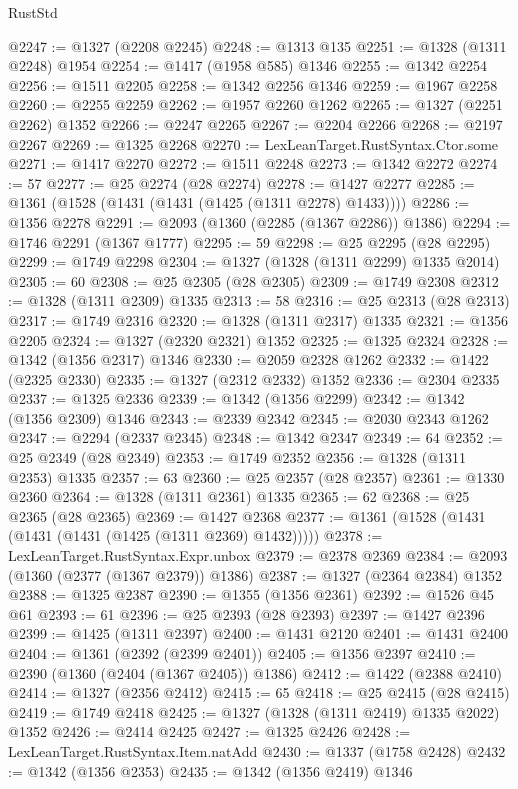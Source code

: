 \begin{lexlean}{RustStd}
\begin{coremodule}
@2247 := @1327 (@2208 @2245)
@2248 := @1313 @135
@2251 := @1328 (@1311 @2248) @1954
@2254 := @1417 (@1958 @585) @1346
@2255 := @1342 @2254
@2256 := @1511 @2205
@2258 := @1342 @2256 @1346
@2259 := @1967 @2258
@2260 := @2255 @2259
@2262 := @1957 @2260 @1262
@2265 := @1327 (@2251 @2262) @1352
@2266 := @2247 @2265
@2267 := @2204 @2266
@2268 := @2197 @2267
@2269 := @1325 @2268
@2270 := LexLeanTarget.RustSyntax.Ctor.some
@2271 := @1417 @2270
@2272 := @1511 @2248
@2273 := @1342 @2272
@2274 := 57
@2277 := @25 @2274 (@28 @2274)
@2278 := @1427 @2277
@2285 := @1361 (@1528 (@1431 (@1431 (@1425 (@1311 @2278) @1433))))
@2286 := @1356 @2278
@2291 := @2093 (@1360 (@2285 (@1367 @2286)) @1386)
@2294 := @1746 @2291 (@1367 @1777)
@2295 := 59
@2298 := @25 @2295 (@28 @2295)
@2299 := @1749 @2298
@2304 := @1327 (@1328 (@1311 @2299) @1335 @2014)
@2305 := 60
@2308 := @25 @2305 (@28 @2305)
@2309 := @1749 @2308
@2312 := @1328 (@1311 @2309) @1335
@2313 := 58
@2316 := @25 @2313 (@28 @2313)
@2317 := @1749 @2316
@2320 := @1328 (@1311 @2317) @1335
@2321 := @1356 @2205
@2324 := @1327 (@2320 @2321) @1352
@2325 := @1325 @2324
@2328 := @1342 (@1356 @2317) @1346
@2330 := @2059 @2328 @1262
@2332 := @1422 (@2325 @2330)
@2335 := @1327 (@2312 @2332) @1352
@2336 := @2304 @2335
@2337 := @1325 @2336
@2339 := @1342 (@1356 @2299)
@2342 := @1342 (@1356 @2309) @1346
@2343 := @2339 @2342
@2345 := @2030 @2343 @1262
@2347 := @2294 (@2337 @2345)
@2348 := @1342 @2347
@2349 := 64
@2352 := @25 @2349 (@28 @2349)
@2353 := @1749 @2352
@2356 := @1328 (@1311 @2353) @1335
@2357 := 63
@2360 := @25 @2357 (@28 @2357)
@2361 := @1330 @2360
@2364 := @1328 (@1311 @2361) @1335
@2365 := 62
@2368 := @25 @2365 (@28 @2365)
@2369 := @1427 @2368
@2377 := @1361 (@1528 (@1431 (@1431 (@1431 (@1425 (@1311 @2369) @1432)))))
@2378 := LexLeanTarget.RustSyntax.Expr.unbox
@2379 := @2378 @2369
@2384 := @2093 (@1360 (@2377 (@1367 @2379)) @1386)
@2387 := @1327 (@2364 @2384) @1352
@2388 := @1325 @2387
@2390 := @1355 (@1356 @2361)
@2392 := @1526 @45 @61
@2393 := 61
@2396 := @25 @2393 (@28 @2393)
@2397 := @1427 @2396
@2399 := @1425 (@1311 @2397)
@2400 := @1431 @2120
@2401 := @1431 @2400
@2404 := @1361 (@2392 (@2399 @2401))
@2405 := @1356 @2397
@2410 := @2390 (@1360 (@2404 (@1367 @2405)) @1386)
@2412 := @1422 (@2388 @2410)
@2414 := @1327 (@2356 @2412)
@2415 := 65
@2418 := @25 @2415 (@28 @2415)
@2419 := @1749 @2418
@2425 := @1327 (@1328 (@1311 @2419) @1335 @2022) @1352
@2426 := @2414 @2425
@2427 := @1325 @2426
@2428 := LexLeanTarget.RustSyntax.Item.natAdd
@2430 := @1337 (@1758 @2428)
@2432 := @1342 (@1356 @2353)
@2435 := @1342 (@1356 @2419) @1346

\end{coremodule}
\end{lexlean}
